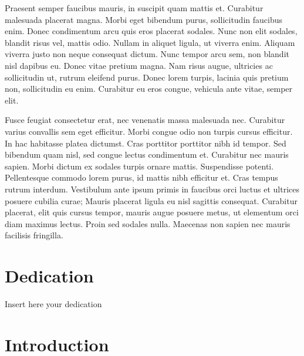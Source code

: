 \documentclass[
]{article}
\begin{document}
Praesent semper faucibus mauris, in suscipit quam mattis et. Curabitur malesuada placerat magna. Morbi eget bibendum purus, sollicitudin faucibus enim. Donec condimentum arcu quis eros placerat sodales. Nunc non elit sodales, blandit risus vel, mattis odio. Nullam in aliquet ligula, ut viverra enim. Aliquam viverra justo non neque consequat dictum. Nunc tempor arcu sem, non blandit nisl dapibus eu. Donec vitae pretium magna. Nam risus augue, ultricies ac sollicitudin ut, rutrum eleifend purus. Donec lorem turpis, lacinia quis pretium non, sollicitudin eu enim. Curabitur eu eros congue, vehicula ante vitae, semper elit.

Fusce feugiat consectetur erat, nec venenatis massa malesuada nec. Curabitur varius convallis sem eget efficitur. Morbi congue odio non turpis cursus efficitur. In hac habitasse platea dictumst. Cras porttitor porttitor nibh id tempor. Sed bibendum quam nisl, sed congue lectus condimentum et. Curabitur nec mauris sapien. Morbi dictum ex sodales turpis ornare mattis. Suspendisse potenti. Pellentesque commodo lorem purus, id mattis nibh efficitur et. Cras tempus rutrum interdum. Vestibulum ante ipsum primis in faucibus orci luctus et ultrices posuere cubilia curae; Mauris placerat ligula eu nisl sagittis consequat. Curabitur placerat, elit quis cursus tempor, mauris augue posuere metus, ut elementum orci diam maximus lectus. Proin sed sodales nulla. Maecenas non sapien nec mauris facilisis fringilla.

\clearpage

\section*{Dedication}

\begin{center}
    \vspace*{\fill}
    Insert here your dedication
    \vspace*{\fill}
\end{center}

\clearpage

\section{Introduction}\label{introduction}


\renewcommand{\thefigure}{1.\arabic{figure}}
\setcounter{figure}{0}
\renewcommand{\thetable}{1.\arabic{table}}
\setcounter{table}{0}
\renewcommand{\theequation}{1.\arabic{equation}}
\setcounter{equation}{0}
\end{document}
